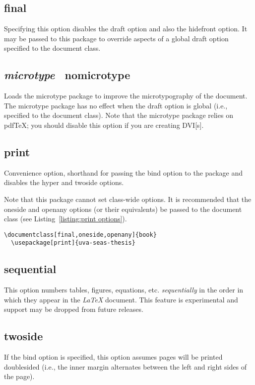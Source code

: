 \documentclass[10pt]{article}
\newcommand{\package}[1]{#1}
\newcommand{\option}[1]{#1}
\newcommand{\default}[1]{\emph{#1}}
\begin{document}
\subsection{\option{final}}
Specifying this option disables the \option{draft} option and also the \option{hidefront} option.
It may be passed to this package to override aspects of a global \option{draft} option specified to the document class.

\subsection{\default{\option{microtype}} \textbar\ \option{nomicrotype}}
Loads the \package{microtype} package to improve the microtypography of the document.
The \package{microtype} package has no effect when the \option{draft} option is global (i.e., specified to the document class).
Note that the \package{microtype} package relies on pdf\TeX; you should disable this option if you are creating \gls{DVI}[s].

\subsection{\option{print}}
Convenience option, shorthand for passing the \option{bind} option to the package and disables the \option{hyper} and \option{twoside} options.

Note that this package cannot set class-wide options.
It is recommended that the \option{oneside} and \option{openany} options (or their equivalents) be passed to the document class (see Listing~\ref{listing:print options}).

\begin{lstlisting}[gobble=2,float=h,caption={
    Example of options that are recommend for creating a print version.
  },label={listing:print options}]
  \documentclass[final,oneside,openany]{book}
  \usepackage[print]{uva-seas-thesis}
\end{lstlisting}

\subsection{\option{sequential}}
This option numbers tables, figures, equations, etc. \emph{sequentially} in the order in which they appear in the \emph{\LaTeX} document.
This feature is experimental and support may be dropped from future releases.

\subsection{\option{twoside}}
If the bind option is specified, this option assumes pages will be printed doublesided (i.e., the inner margin alternates between the left and right sides of the page).
\end{document}
